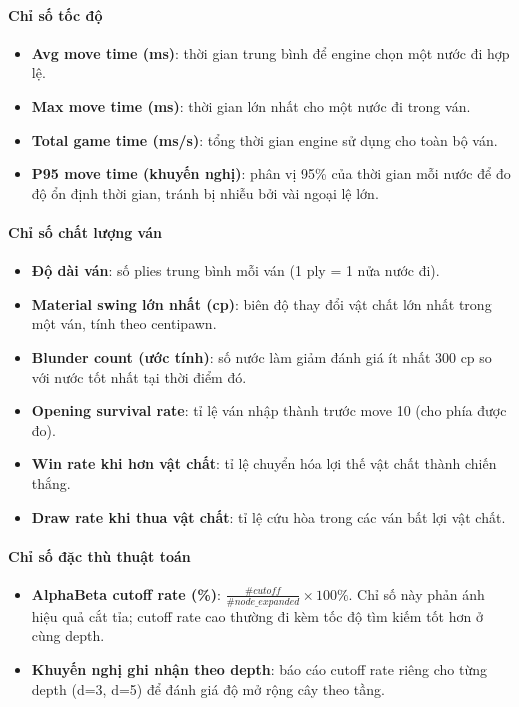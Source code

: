 \paragraph*{Chỉ số tốc độ}
\begin{itemize}
    \item \textbf{Avg move time (ms)}: thời gian trung bình để engine chọn một nước đi hợp lệ.
    \item \textbf{Max move time (ms)}: thời gian lớn nhất cho một nước đi trong ván.
    \item \textbf{Total game time (ms/s)}: tổng thời gian engine sử dụng cho toàn bộ ván.
    \item \textbf{P95 move time (khuyến nghị)}: phân vị 95\% của thời gian mỗi nước để đo độ ổn định thời gian, tránh bị nhiễu bởi vài ngoại lệ lớn.
\end{itemize}

\paragraph*{Chỉ số chất lượng ván}
\begin{itemize}
    \item \textbf{Độ dài ván}: số plies trung bình mỗi ván (1 ply = 1 nửa nước đi).
    \item \textbf{Material swing lớn nhất (cp)}: biên độ thay đổi vật chất lớn nhất trong một ván, tính theo centipawn.
    \item \textbf{Blunder count (ước tính)}: số nước làm giảm đánh giá ít nhất 300 cp so với nước tốt nhất tại thời điểm đó.
    \item \textbf{Opening survival rate}: tỉ lệ ván nhập thành trước move 10 (cho phía được đo).
    \item \textbf{Win rate khi hơn vật chất}: tỉ lệ chuyển hóa lợi thế vật chất thành chiến thắng.
    \item \textbf{Draw rate khi thua vật chất}: tỉ lệ cứu hòa trong các ván bất lợi vật chất.
\end{itemize}

\paragraph*{Chỉ số đặc thù thuật toán}
\begin{itemize}
    \item \textbf{AlphaBeta cutoff rate (\%)}: \(\frac{\#cutoff}{\#node\_expanded}\times 100\%\). Chỉ số này phản ánh hiệu quả cắt tỉa; cutoff rate cao thường đi kèm tốc độ tìm kiếm tốt hơn ở cùng depth.
    \item \textbf{Khuyến nghị ghi nhận theo depth}: báo cáo cutoff rate riêng cho từng depth (d=3, d=5) để đánh giá độ mở rộng cây theo tầng.
\end{itemize}

